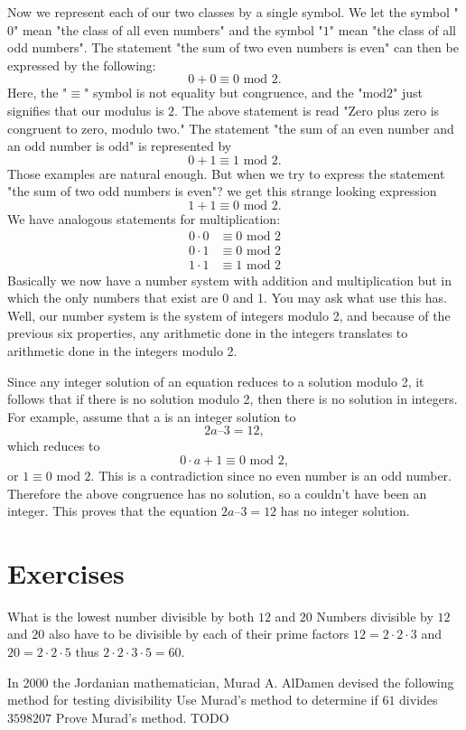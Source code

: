 Now we represent each of our two classes by a single symbol. We let the symbol "$0$" mean "the class of all even numbers" and the symbol "$1$" mean "the class of all odd numbers". The statement "the sum of two even numbers is even" can then be expressed by the following:
\[
0 + 0 \equiv 0 \textrm{ mod } 2.
\]
Here, the "$\equiv$" symbol is not equality but congruence, and the "$\textrm{mod} 2$" just signifies that our modulus is $2$. The above statement is read "Zero plus zero is congruent to zero, modulo two." The statement "the sum of an even number and an odd number is odd" is represented by
\[
0 + 1 \equiv 1 \textrm{ mod } 2.
\]
Those examples are natural enough. But when we try to express the statement "the sum of two odd numbers is even"? we get this strange looking expression
\[
1 + 1 \equiv 0 \textrm{ mod } 2.
\]
We have analogous statements for multiplication:
\begin{align*}
0 \cdot 0 &\equiv 0 \textrm{ mod } 2 \\
0 \cdot 1 &\equiv 0 \textrm{ mod } 2 \\
1 \cdot 1 &\equiv 1 \textrm{ mod } 2
\end{align*}
Basically we now have a number system with addition and multiplication but in which the only numbers that exist are 0 and 1. You may ask what use this has. Well, our number system is the system of integers modulo 2, and because of the previous six properties, any arithmetic done in the integers translates to arithmetic done in the integers modulo 2.

Since any integer solution of an equation reduces to a solution modulo 2, it follows that if there is no solution modulo 2, then there is no solution in integers. For example, assume that a is an integer solution to
\[
2a – 3 = 12,
\]
which reduces to
\[
0 \cdot a + 1 \equiv 0 \textrm{ mod } 2,
\]
or $1 \equiv 0 \textrm{ mod } 2$. This is a contradiction since no even number is an odd number. Therefore the above congruence has no solution, so a couldn't have been an integer. This proves that the equation $2a – 3 = 12$ has no integer solution.

\section{Exercises}
\begin{ExerciseList}

\Exercise What is the lowest number divisible by both $12$ and $20$
\Answer Numbers divisible by $12$ and $20$ also have to be divisible by each of their prime factors $12 = 2 \cdot 2 \cdot 3$ and $20 = 2 \cdot 2 \cdot 5$ thus $2 \cdot 2 \cdot 3 \cdot 5 = 60$.

\Exercise In 2000 the Jordanian mathematician, Murad A. AlDamen devised the following method for testing divisibility 
\Question Use Murad's method to determine if $61$ divides $3598207$
\Question Prove Murad's method.
\Answer TODO
\end{ExerciseList}

